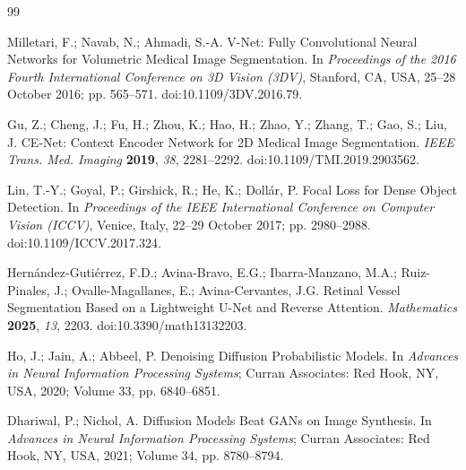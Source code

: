 \documentclass[jimaging,article,submit,pdftex,moreauthors]{Definitions/mdpi}%
\providecommand{\href}[2]{#2}
\begin{document}
\begin{thebibliography}{99}




Milletari, F.; Navab, N.; Ahmadi, S.-A. V-Net: Fully Convolutional Neural Networks for Volumetric Medical Image Segmentation. In \textit{Proceedings of the 2016 Fourth International Conference on 3D Vision (3DV)}, Stanford, CA, USA, 25--28 October 2016; pp. 565--571. \href{https://doi.org/10.1109/3DV.2016.79}{doi:10.1109/3DV.2016.79}.




Gu, Z.; Cheng, J.; Fu, H.; Zhou, K.; Hao, H.; Zhao, Y.; Zhang, T.; Gao, S.; Liu, J. CE-Net: Context Encoder Network for 2D Medical Image Segmentation. \textit{IEEE Trans. Med. Imaging} \textbf{2019}, \textit{38}, 2281--2292. \href{https://doi.org/10.1109/TMI.2019.2903562}{doi:10.1109/TMI.2019.2903562}.




Lin, T.-Y.; Goyal, P.; Girshick, R.; He, K.; Doll\'ar, P. Focal Loss for Dense Object Detection. In \textit{Proceedings of the IEEE International Conference on Computer Vision (ICCV)}, Venice, Italy, 22--29 October 2017; pp. 2980--2988. \href{https://doi.org/10.1109/ICCV.2017.324}{doi:10.1109/ICCV.2017.324}.




Hern\'andez-Guti\'errez, F.D.; Avina-Bravo, E.G.; Ibarra-Manzano, M.A.; Ruiz-Pinales, J.; Ovalle-Magallanes, E.; Avina-Cervantes, J.G. Retinal Vessel Segmentation Based on a Lightweight U-Net and Reverse Attention. \textit{Mathematics} \textbf{2025}, \textit{13}, 2203. \href{https://doi.org/10.3390/math13132203}{doi:10.3390/math13132203}.




Ho, J.; Jain, A.; Abbeel, P. Denoising Diffusion Probabilistic Models. In \textit{Advances in Neural Information Processing Systems}; Curran Associates: Red Hook, NY, USA, 2020; Volume 33, pp. 6840--6851.




Dhariwal, P.; Nichol, A. Diffusion Models Beat GANs on Image Synthesis. In \textit{Advances in Neural Information Processing Systems}; Curran Associates: Red Hook, NY, USA, 2021; Volume 34, pp. 8780--8794.




\end{thebibliography}
\end{document}
